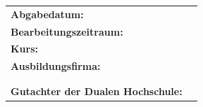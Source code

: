 \begin{titlepage}
\begin{center}
	\vfill
	\begin{tabular}{ll}
		\textbf{Abgabedatum:}                     & \abgabe \\[0.2cm]
		\textbf{Bearbeitungszeitraum:}            & \bearbeitungszeitraum \\[0.2cm]
		\textbf{Kurs:}            				  & \kurs \\[0.2cm]
		\textbf{Ausbildungsfirma:}                & \firmaName \\
		                                 		  & \firmaStrasse \\
		                                          & \firmaPlz \\[0.2cm]
		\textbf{Gutachter der Dualen Hochschule:} & \betreuerDhbw \\[2cm]
	\end{tabular} 
\end{center}
\end{titlepage}
